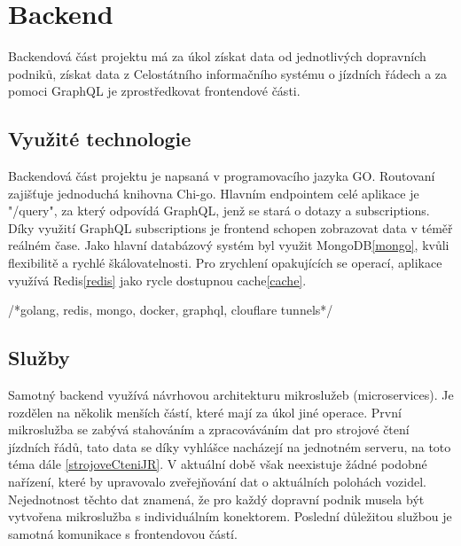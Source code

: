 \section{Backend}
Backendová část projektu má za úkol získat data od jednotlivých dopravních podniků, získat data z Celostátního informačního systému o jízdních řádech\cite{cisjr} a za pomoci GraphQL je zprostředkovat frontendové části.
\subsection{Využité technologie}
Backendová část projektu je napsaná v programovacího jazyka GO. Routovaní zajišťuje jednoduchá knihovna Chi-go. Hlavním endpointem celé aplikace je "/query", za který odpovídá GraphQL, jenž se stará o dotazy a subscriptions. Díky využití GraphQL subscriptions je frontend schopen zobrazovat data v téměř reálném čase. Jako hlavní databázový systém byl využit MongoDB\ref{mongo}, kvůli flexibilitě a rychlé škálovatelnosti. Pro zrychlení opakujících se operací, aplikace využívá Redis\ref{redis} jako rycle dostupnou cache\ref{cache}. \par

/*golang, redis, mongo, docker, graphql, clouflare tunnels*/
\subsection{Služby}
Samotný backend využívá návrhovou architekturu mikroslužeb (microservices). Je rozdělen na několik menších částí, které mají za úkol jiné operace. První mikroslužba se zabývá stahováním a zpracováváním dat pro strojové čtení jízdních řádů, tato data se díky vyhlášce\cite{vyhlaskaJizdniRady} nacházejí na jednotném serveru, na toto téma dále \ref{strojoveCteniJR}. V aktuální době však neexistuje žádné podobné nařízení, které by upravovalo zveřejňování dat o aktuálních polohách vozidel. Nejednotnost těchto dat znamená, že pro každý dopravní podnik musela být vytvořena mikroslužba s individuálním konektorem. Poslední důležitou službou je samotná komunikace s frontendovou částí.
